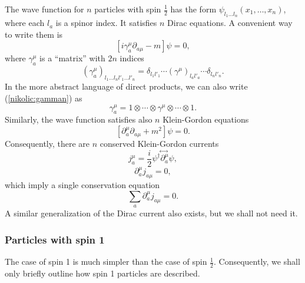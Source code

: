 \documentclass[12pt,twoside]{report} %
\begin{document}
The wave function for $n$ particles with spin $\frac{1}{2}$ has the form
$\psi_{l_1\dots l_n}(x_1,\ldots,x_n)$, where each $l_a$ is a spinor index.
It satisfies $n$ Dirac equations. A convenient way to write them is
\begin{equation}\label{nikolic:diraccn}
[i\gamma^{\mu}_a\partial_{a\mu}-m]\psi=0 ,
\end{equation}
where $\gamma^{\mu}_a$ is a ``matrix'' with $2n$ indices
\begin{equation}\label{nikolic:gamman}
 (\gamma^{\mu}_a)_{l_1\dots l_n l'_1\dots l'_n}=
\delta_{l_1 l'_1} \cdots (\gamma^{\mu})_{l_a l'_a} \cdots \delta_{l_n l'_n} .
\end{equation}
In the more abstract language of direct products, we can also write (\ref{nikolic:gamman}) as
\begin{equation}
 \gamma^{\mu}_a=1\otimes\cdots \otimes\gamma^{\mu}\otimes\cdots\otimes 1. 
\end{equation}
Similarly, the wave function satisfies also $n$ Klein-Gordon equations
\begin{equation}\label{nikolic:KGspn}
 [\partial_a^{\mu}\partial_{a\mu}+m^2]\psi =0 .
\end{equation}
Consequently, there are $n$ conserved Klein-Gordon currents 
\begin{equation}\label{nikolic:curnsn}
j^{\mu}_a=\frac{i}{2}\psi^{\dagger} \!\stackrel{\leftrightarrow\;}{\partial^{\mu}_a}\! \psi ,
\end{equation}
\begin{equation}\label{nikolic:conssn}
\partial^{\mu}_a j_{a\mu}=0,
\end{equation}
which imply a single conservation equation
\begin{equation}\label{nikolic:conssns}
\sum_a\partial^{\mu}_a j_{a\mu}=0.
\end{equation}
A similar generalization of the Dirac current also exists, but we shall not need it.


\subsubsection{Particles with spin 1}
\label{nikolic:SECspin1}

The case of spin 1 is much simpler than the case of spin $\frac{1}{2}$. 
Consequently, we shall only briefly outline how spin 1 particles are described.
\end{document}
